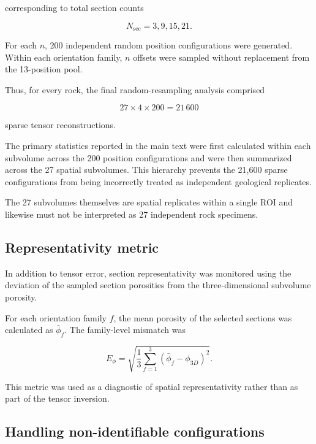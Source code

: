\documentclass{article}
\begin{document}
corresponding to total section counts

\begin{equation}
    N_{\mathrm{sec}}=3,9,15,21.
\end{equation}

For each $n$, 200 independent random position configurations were
generated. Within each orientation family, $n$ offsets were sampled
without replacement from the 13-position pool.

Thus, for every rock, the final random-resampling analysis comprised

\begin{equation}
    27\times4\times200
    =
    21\,600
\end{equation}

sparse tensor reconstructions.

The primary statistics reported in the main text were first calculated
within each subvolume across the 200 position configurations and were
then summarized across the 27 spatial subvolumes. This hierarchy
prevents the 21,600 sparse configurations from being incorrectly treated
as independent geological replicates.

The 27 subvolumes themselves are spatial replicates within a single ROI
and likewise must not be interpreted as 27 independent rock specimens.

\subsection{Representativity metric}
\label{sec:SI_representativity}

In addition to tensor error, section representativity was monitored
using the deviation of the sampled section porosities from the
three-dimensional subvolume porosity.

For each orientation family $f$, the mean porosity of the selected
sections was calculated as $\bar{\phi}_f$. The family-level mismatch was

\begin{equation}
    E_{\phi}
    =
    \sqrt{
    \frac{1}{3}
    \sum_{f=1}^{3}
    \left(
    \bar{\phi}_f-\phi_{3D}
    \right)^2
    }.
\end{equation}

This metric was used as a diagnostic of spatial representativity rather
than as part of the tensor inversion.

\subsection{Handling non-identifiable configurations}
\label{sec:SI_rankfailure}
\end{document}
